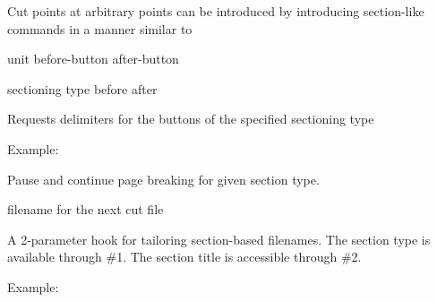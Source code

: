 Cut points at arbitrary points can be introduced by introducing section-like
commands in a manner similar to

\begin{texsource}
\NewSection\mysection{}
\end{texsource}

 {unit} {before-button} {after-button}\EndDoc

{sectioning type}
{before}
{after}\EndDoc

Requests delimiters for the  buttons of the specified
     sectioning type

Example:   

\begin{texsource}
\end{texsource}


Pause and continue page breaking for given section type.

 {filename for the next cut file}\EndDoc

   A 2-parameter hook for tailoring section-based filenames.
   The section type is available through \#1. The section title
   is accessible through \#2.

Example:

\begin{texsource}
\end{texsource}



